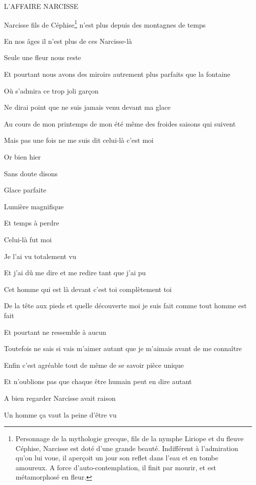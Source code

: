 {%
\begin{center}
L'AFFAIRE NARCISSE
\end{center}

\setlength{\parskip}{0pt}

\bigskip

Narcisse fils de Céphise\footnote{Personnage de la mythologie grecque, fils de la nymphe Liriope et du fleuve Céphise, Narcisse est doté d'une grande beauté. Indifférent à l'admiration qu'on lui voue, il aperçoit un jour son reflet dans l'eau et en tombe amoureux. A force d'auto-contemplation, il finit par mourir, et est métamorphosé en fleur.} n'est plus depuis des montagnes de temps

En nos âges il n'est plus de ces Narcisse-là

Seule une fleur nous reste

Et pourtant nous avons des miroirs autrement plus parfaits que la
fontaine

Où s'admira ce trop joli garçon

Ne dirai point que ne suis jamais venu devant ma glace

Au cours de mon printemps de mon été même des froides saisons qui
suivent

Mais pas une fois ne me suis dit celui-là c'est moi

Or bien hier

Sans doute disons

Glace parfaite

Lumière magnifique

Et temps à perdre

Celui-là fut moi

Je l'ai vu totalement vu

Et j'ai dû me dire et me redire tant que j'ai pu

Cet homme qui est là devant c'est toi complètement toi

De la tête aux pieds et quelle découverte moi je suis fait comme tout
homme est fait

Et pourtant ne ressemble à aucun

Toutefois ne sais si vais m'aimer autant que je m'aimais avant de me
connaître

Enfin c'est agréable tout de même de se savoir pièce unique

Et n'oublions pas que chaque être humain peut en dire autant

A bien regarder Narcisse avait raison

Un homme ça vaut la peine d'être vu

\setlength{\parskip}{6pt}
}

